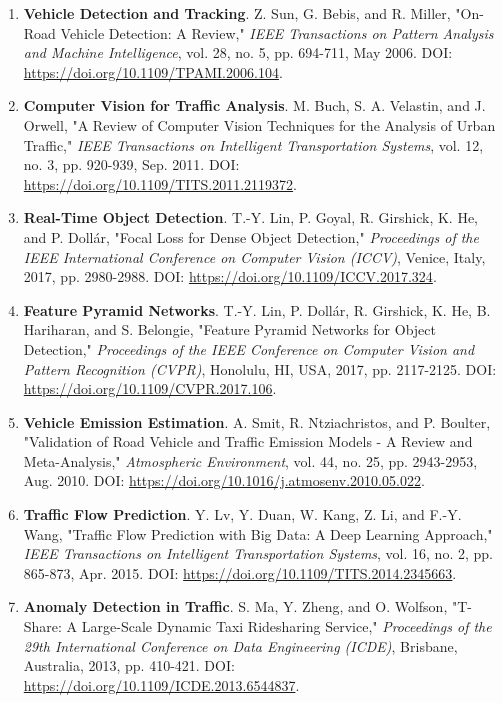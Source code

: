 \begin{enumerate}[resume]
    \item \textbf{Vehicle Detection and Tracking}. Z. Sun, G. Bebis, and R. Miller, "On-Road Vehicle Detection: A Review," 
    \textit{IEEE Transactions on Pattern Analysis and Machine Intelligence}, vol. 28, no. 5, pp. 694-711, May 2006. 
    DOI: \url{https://doi.org/10.1109/TPAMI.2006.104}.
    
    \item \textbf{Computer Vision for Traffic Analysis}. M. Buch, S. A. Velastin, and J. Orwell, 
    "A Review of Computer Vision Techniques for the Analysis of Urban Traffic," 
    \textit{IEEE Transactions on Intelligent Transportation Systems}, vol. 12, no. 3, pp. 920-939, Sep. 2011. 
    DOI: \url{https://doi.org/10.1109/TITS.2011.2119372}.
    
    \item \textbf{Real-Time Object Detection}. T.-Y. Lin, P. Goyal, R. Girshick, K. He, and P. Dollár, 
    "Focal Loss for Dense Object Detection," \textit{Proceedings of the IEEE International Conference on Computer Vision (ICCV)}, 
    Venice, Italy, 2017, pp. 2980-2988. DOI: \url{https://doi.org/10.1109/ICCV.2017.324}.
    
    \item \textbf{Feature Pyramid Networks}. T.-Y. Lin, P. Dollár, R. Girshick, K. He, B. Hariharan, and S. Belongie, 
    "Feature Pyramid Networks for Object Detection," \textit{Proceedings of the IEEE Conference on Computer Vision and Pattern Recognition (CVPR)}, 
    Honolulu, HI, USA, 2017, pp. 2117-2125. DOI: \url{https://doi.org/10.1109/CVPR.2017.106}.
    
    \item \textbf{Vehicle Emission Estimation}. A. Smit, R. Ntziachristos, and P. Boulter, 
    "Validation of Road Vehicle and Traffic Emission Models - A Review and Meta-Analysis," 
    \textit{Atmospheric Environment}, vol. 44, no. 25, pp. 2943-2953, Aug. 2010. 
    DOI: \url{https://doi.org/10.1016/j.atmosenv.2010.05.022}.
    
    \item \textbf{Traffic Flow Prediction}. Y. Lv, Y. Duan, W. Kang, Z. Li, and F.-Y. Wang, 
    "Traffic Flow Prediction with Big Data: A Deep Learning Approach," 
    \textit{IEEE Transactions on Intelligent Transportation Systems}, vol. 16, no. 2, pp. 865-873, Apr. 2015. 
    DOI: \url{https://doi.org/10.1109/TITS.2014.2345663}.
    
    \item \textbf{Anomaly Detection in Traffic}. S. Ma, Y. Zheng, and O. Wolfson, "T-Share: A Large-Scale Dynamic Taxi Ridesharing Service," 
    \textit{Proceedings of the 29th International Conference on Data Engineering (ICDE)}, 
    Brisbane, Australia, 2013, pp. 410-421. DOI: \url{https://doi.org/10.1109/ICDE.2013.6544837}.
    

\end{enumerate}
